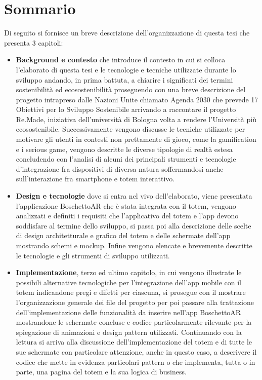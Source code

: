 \section*{Sommario}
Di seguito si fornisce un breve descrizione dell'organizzazione di questa tesi che presenta 3 capitoli:
\begin{itemize}
    \item \textbf{Background e contesto} che introduce il contesto in cui si colloca l'elaborato di questa tesi e le tecnologie e tecniche utilizzate durante lo sviluppo andando, in prima battuta, a chiarire i significati dei termini sostenibilità ed ecosostenibilità proseguendo con una breve descrizione del progetto intrapreso dalle Nazioni Unite chiamato Agenda 2030 che prevede 17 Obiettivi per lo Sviluppo Sostenibile arrivando a raccontare il progetto Re.Made, iniziativa dell'università di Bologna volta a rendere l'Università più ecosostenibile.
    Successivamente vengono discusse le tecniche utilizzate per motivare gli utenti in contesti non prettamente di gioco, come la gamification e i serious game, vengono descritte le diverse tipologie di realtà estesa concludendo con l'analisi di alcuni dei principali strumenti e tecnologie d'integrazione fra dispositivi di diversa natura soffermandosi anche sull'interazione fra smartphone e totem interattivo.
    \item \textbf{Design e tecnologie} dove si entra nel vivo dell'elaborato, viene presentata l'applicazione BoschettoAR che è stata integrata con il totem, vengono analizzati e definiti i requisiti che l'applicativo del totem e l'app devono soddisfare al termine dello sviluppo, si passa poi alla descrizione delle scelte di design architetturale e grafico del totem e delle schermate dell'app mostrando schemi e mockup. Infine vengono elencate e brevemente descritte le tecnologie e gli strumenti di sviluppo utilizzati.
    \item \textbf{Implementazione}, terzo ed ultimo capitolo, in cui vengono illustrate le possibili alternative tecnologiche per l'integrazione dell'app mobile con il totem indicandone pregi e difetti per ciascuna, si prosegue con il mostrare l'organizzazione generale dei file del progetto per poi passare alla trattazione dell'implementazione delle funzionalità da inserire nell'app BoschettoAR mostrandone le schermate concluse e codice particolarmente rilevante per la spiegazione di animazioni e design pattern utilizzati. Continuando con la lettura si arriva alla discussione dell'implementazione del totem e di tutte le sue schermate con particolare attenzione, anche in questo caso, a descrivere il codice che mette in evidenza particolari pattern o che implementa, tutta o in parte, una pagina del totem e la sua logica di business.
    
\end{itemize}